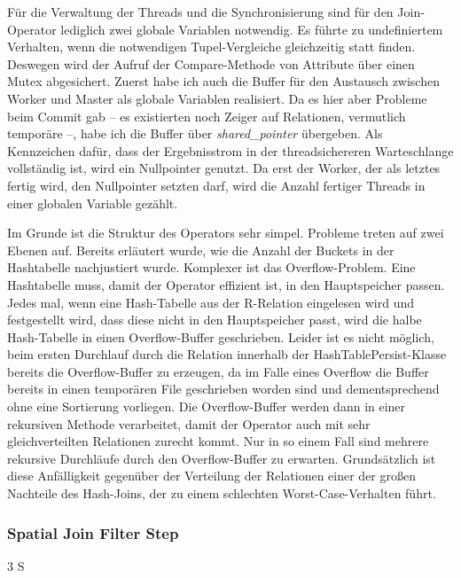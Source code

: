 \documentclass[a4paper,12pt,twoside]{article}
\newcommand{\Fb}[1]{\textit{#1}} %
\begin{document}
Für die Verwaltung der Threads und die Synchronisierung sind für den Join-Operator lediglich zwei globale Variablen notwendig. Es führte zu undefiniertem Verhalten, wenn die notwendigen Tupel-Vergleiche gleichzeitig statt finden. Deswegen wird der Aufruf der Compare-Methode von Attribute über einen Mutex abgesichert. Zuerst habe ich auch die Buffer für den Austausch zwischen Worker und Master als globale Variablen realisiert. Da es hier aber Probleme beim Commit gab -- es existierten noch Zeiger auf Relationen, vermutlich temporäre --, habe ich die Buffer über \Fb{shared\_pointer} übergeben. Als Kennzeichen dafür, dass der Ergebnisstrom in der threadsichereren Warteschlange vollständig ist, wird ein Nullpointer genutzt. Da erst der Worker, der als letztes fertig wird, den Nullpointer setzten darf, wird die Anzahl fertiger Threads in einer globalen Variable gezählt.
 
Im Grunde ist die Struktur des Operators sehr simpel. Probleme treten auf zwei Ebenen auf. Bereits erläutert wurde, wie die Anzahl der Buckets in der Hashtabelle nachjustiert wurde. Komplexer ist das Overflow-Problem. Eine Hashtabelle muss, damit der Operator effizient ist, in den Hauptspeicher passen. Jedes mal, wenn eine Hash-Tabelle aus der R-Relation eingelesen wird und festgestellt wird, dass diese nicht in den Hauptspeicher passt, wird die halbe Hash-Tabelle in einen Overflow-Buffer geschrieben. Leider ist es nicht möglich, beim ersten Durchlauf durch die Relation innerhalb der HashTablePersist-Klasse bereits die Overflow-Buffer zu erzeugen, da im Falle eines Overflow die Buffer bereits in einen temporären File geschrieben worden sind und dementsprechend ohne eine Sortierung vorliegen. Die Overflow-Buffer werden dann in einer rekursiven Methode verarbeitet, damit der Operator auch mit sehr gleichverteilten Relationen zurecht kommt. Nur in so einem Fall sind mehrere rekursive Durchläufe durch den Overflow-Buffer zu erwarten. Grundsätzlich ist diese Anfälligkeit gegenüber der Verteilung der Relationen einer der großen Nachteile des Hash-Joins, der zu einem schlechten Worst-Case-Verhalten führt.

\subsubsection{Spatial Join Filter Step} 3 S
\end{document}
